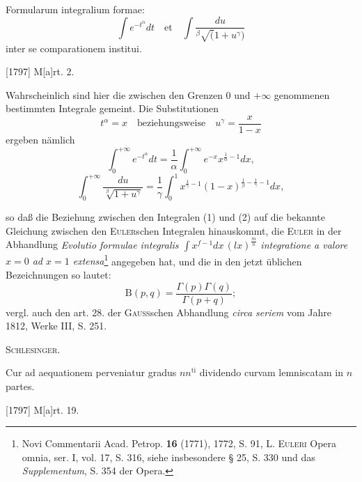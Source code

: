 \indent Formularum integralium formae:
\[
\int e^{-t^\alpha}dt\quad\text{et}\quad\int\frac{du}{{}^{\beta}\!\surd(1+u^\gamma)}
\]
\noindent inter se comparationem institui.
\par\noindent\hfill[1797] M[a]rt. 2.

\medskip\begingroup\small\makeatletter\let\veqno\@@leqno\makeatother
\indent Wahrscheinlich sind hier die zwischen den Grenzen \(0\) und \(+\infty\) genommenen bestimmten Integrale gemeint. Die Substitutionen
\[
t^\alpha=x\quad\text{beziehungsweise}\quad u^\gamma=\frac{x}{1-x}
\]
\noindent ergeben nämlich
\begin{equation*}\tag*{(1)}
\int_0^{+\infty}e^{-t^\alpha}dt=\frac1\alpha\int_0^{+\infty}e^{-x}x^{\frac1\alpha-1}dx,
\end{equation*}
\begin{equation*}\tag*{(2)}
\int_0^{+\infty}\frac{du}{\sqrt[\beta]{1+u^\gamma}}=\frac1\gamma\int_0^1x^{\frac1\gamma-1}(1-x)^{\frac1\beta-\frac1\gamma-1}dx,
\end{equation*}
\par\endgroup

\clearpage{}
\begingroup\small
\noindent so daß die Beziehung zwischen den Integralen (1) und (2) auf die bekannte Gleichung zwischen den \textsc{Euler}schen Integralen hinauskommt, die \textsc{Euler} in der Abhandlung \textit{Evolutio formulae integralis \(\int x^{f-1}dx\,(lx)^{\frac mn}\) integratione a valore \(x=0\) ad \(x=1\) extensa}\footnote{Novi Commentarii Acad. Petrop. \textbf{16} (1771), 1772, S. 91, L. \textsc{Euleri} Opera omnia, ser. I, vol. 17, S. 316, siehe insbesondere § 25, S. 330 und das \textit{Supplementum}, S. 354 der Opera.} angegeben hat, und die in den jetzt üblichen Bezeichnungen so lautet:
\[
\mathrm{B}(p,q)=\frac{\Gamma(p)\Gamma(q)}{\Gamma(p+q)};
\]
\noindent vergl. auch den art. 28. der \textsc{Gauss}schen Abhandlung \textit{circa seriem} vom Jahre 1812, Werke III, S. 251.
\par\noindent\hfill\textsc{Schlesinger.}
\par\endgroup

\indent Cur ad aequationem perveniatur gradus \(nn^{\mathrm{ti}}\) dividendo curvam lemniscatam in \(n\) partes.
\par\noindent\hfill[1797] M[a]rt. 19.

